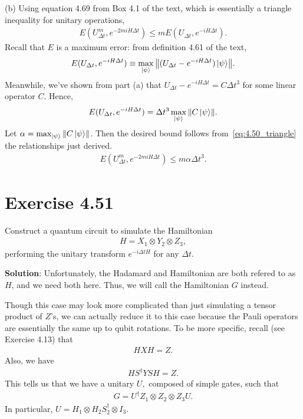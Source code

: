 \documentclass{book}
\begin{document}
    (b) Using equation 4.69 from Box 4.1 of the text, which is essentially a triangle inequality for unitary operations,
    \begin{align} \label{eq:4.50_triangle}
        E(U_{\Delta t}^m, e^{-2miH\Delta t}) \leq m E(U_{\Delta t}, e^{-i H \Delta t}).
    \end{align}
    Recall that $E$ is a maximum error: from definition 4.61 of the text,
    \begin{align}
        E(U_{\Delta t}, e^{-i H \Delta t}) \equiv \max_{\ket{\psi}} \norm{(U_{\Delta t} -e^{-i H \Delta t})\ket{\psi}}.
    \end{align}
    Meanwhile, we've shown from part (a) that $U_{\Delta t} -e^{-i H \Delta t} = C \Delta t^3$ for some linear operator $C$. Hence,
    \begin{align}
        E(U_{\Delta t}, e^{-i H \Delta t}) = \Delta t^3 \max_{\ket{\psi}} \norm{C \ket{\psi}}.
    \end{align}
    Let $\alpha = \max_{\ket{\psi}} \norm{C \ket{\psi}}$. Then the desired bound follows from~\eqref{eq:4.50_triangle} the relationships just derived.
    \begin{align}
        E(U_{\Delta t}^m, e^{-2miH\Delta t}) \leq m \alpha \Delta t^3.
    \end{align}

\section*{Exercise 4.51}
    Construct a quantum circuit to simulate the Hamiltonian
    \begin{align}
        H = X_1 \otimes Y_2 \otimes Z_3,
    \end{align}
    performing the unitary transform $e^{-i\Delta t H}$ for any $\Delta t$.

    \textbf{Solution}: Unfortunately, the Hadamard and Hamiltonian are both refered to as $H$, and we need both here. Thus, we will call the Hamiltonian $G$ instead.
    
    Though this case may look more complicated than just simulating a tensor product of $Z$'s, we can actually reduce it to this case because the Pauli operators are essentially the same up to qubit rotations. To be more specific, recall (see Exercise 4.13) that
    \begin{align}
        HXH = Z.
    \end{align}
    Also, we have
    \begin{align}
        H S^\dagger Y S H = Z.
    \end{align}
    This tells us that we have a unitary $U,$ composed of simple gates, such that
    \begin{align}
        G = U^\dagger Z_1\otimes Z_2 \otimes Z_3 U.
    \end{align}
    In particular, $U = H_1 \otimes H_2 S_2^\dagger \otimes I_3$. 
\end{document}

